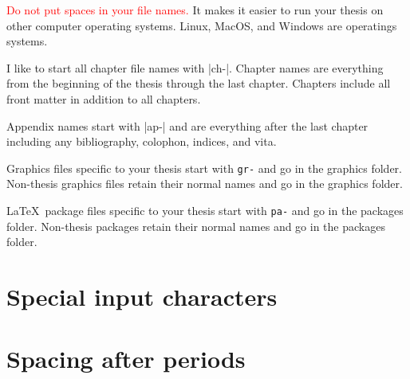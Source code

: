 \textcolor{red}{Do not put spaces in your file names.}
It makes it easier to run your thesis on other computer operating systems.
Linux, MacOS, and Windows are operatings systems.

I like
to start all chapter file names with |ch-|.
Chapter names are everything
from the beginning of the thesis through the last chapter.
Chapters include all front matter in addition
to all chapters.

Appendix names start with |ap-|
and are everything after the last chapter including any bibliography,
colophon,
indices,
and vita.

Graphics files specific to your thesis start
with \verb+gr-+ and go in the graphics folder.
Non-thesis graphics files retain their normal names
and go in the graphics folder.

\LaTeX\ package files specific to your thesis  start
with \verb+pa-+ and go in the packages folder.
Non-thesis packages retain their normal names
and go in the packages folder.


\section{Special input characters}

\UndefineShortVerb{\|}
\DefineShortVerb{\;}  %
\noindent
{
  \setlength{\tabcolsep}{8.5pt}
}
\UndefineShortVerb{\;}
\DefineShortVerb{\|}  %


\section{Spacing after periods}

